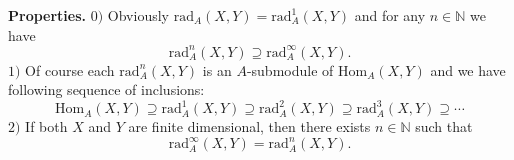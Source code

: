 \documentclass[12pt]{article}
\begin{document}
\textbf{Properties.} $0)$ Obviously $\mathrm{rad}_{A}(X,Y)=\mathrm{rad}^{1}_{A}(X,Y)$ and for any $n\in\mathbb{N}$ we have $$\mathrm{rad}_{A}^{n}(X,Y)\supseteq\mathrm{rad}_{A}^{\infty}(X,Y).$$
$1)$ Of course each $\mathrm{rad}^{n}_{A}(X,Y)$ is an $A$-submodule of $\mathrm{Hom}_{A}(X,Y)$ and we have following sequence of inclusions:
$$\mathrm{Hom}_{A}(X,Y)\supseteq\mathrm{rad}^{1}_{A}(X,Y)\supseteq\mathrm{rad}^{2}_{A}(X,Y)\supseteq\mathrm{rad}^{3}_{A}(X,Y)\supseteq\cdots$$
$2)$ If both $X$ and $Y$ are finite dimensional, then there exists $n\in\mathbb{N}$ such that
$$\mathrm{rad}^{\infty}_{A}(X,Y)=\mathrm{rad}^{n}_{A}(X,Y).$$

\end{document}

